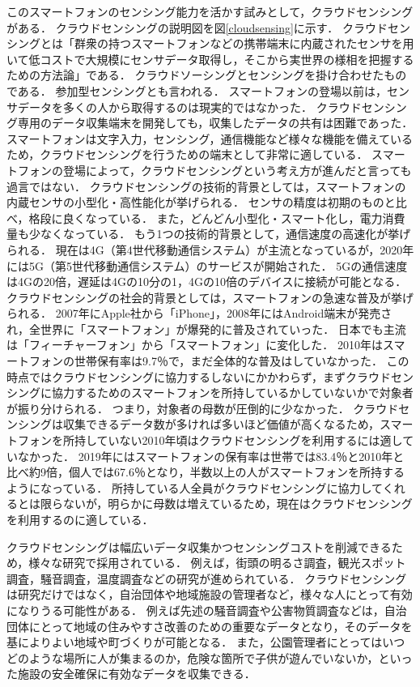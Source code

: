 このスマートフォンのセンシング能力を活かす試みとして，クラウドセンシングがある．
クラウドセンシングの説明図を図\ref{cloudsensing}に示す．
クラウドセンシングとは「群衆の持つスマートフォンなどの携帯端末に内蔵されたセンサを用いて低コストで大規模にセンサデータ取得し，そこから実世界の様相を把握するための方法論\cite{weko}」である．
クラウドソーシングとセンシングを掛け合わせたものである．
参加型センシングとも言われる．
スマートフォンの登場以前は，センサデータを多くの人から取得するのは現実的ではなかった．
クラウドセンシング専用のデータ収集端末を開発しても，収集したデータの共有は困難であった．
スマートフォンは文字入力，センシング，通信機能など様々な機能を備えているため，クラウドセンシングを行うための端末として非常に適している．
スマートフォンの登場によって，クラウドセンシングという考え方が進んだと言っても過言ではない．
クラウドセンシングの技術的背景としては，スマートフォンの内蔵センサの小型化・高性能化が挙げられる．
センサの精度は初期のものと比べ，格段に良くなっている．
また，どんどん小型化・スマート化し，電力消費量も少なくなっている．
もう1つの技術的背景として，通信速度の高速化が挙げられる．
現在は4G（第4世代移動通信システム）が主流となっているが，2020年には5G（第5世代移動通信システム）のサービスが開始された．
5Gの通信速度は4Gの20倍，遅延は4Gの10分の1，4Gの10倍のデバイスに接続が可能となる\cite{5G4G}．
クラウドセンシングの社会的背景としては，スマートフォンの急速な普及が挙げられる．
2007年にApple社から「iPhone」，2008年にはAndroid端末が発売され，全世界に「スマートフォン」が爆発的に普及されていった．
日本でも主流は「フィーチャーフォン」から「スマートフォン」に変化した．
2010年はスマートフォンの世帯保有率は9.7％\cite{soumu}で，まだ全体的な普及はしていなかった．
この時点ではクラウドセンシングに協力するしないにかかわらず，まずクラウドセンシングに協力するためのスマートフォンを所持しているかしていないかで対象者が振り分けられる．
つまり，対象者の母数が圧倒的に少なかった．
クラウドセンシングは収集できるデータ数が多ければ多いほど価値が高くなるため，スマートフォンを所持していない2010年頃はクラウドセンシングを利用するには適していなかった．
2019年にはスマートフォンの保有率は世帯では83.4％と2010年と比べ約9倍，個人では67.6％\cite{soumu}となり，半数以上の人がスマートフォンを所持するようになっている．
所持している人全員がクラウドセンシングに協力してくれるとは限らないが，明らかに母数は増えているため，現在はクラウドセンシングを利用するのに適している．

クラウドセンシングは幅広いデータ収集かつセンシングコストを削減できるため，様々な研究で採用されている．
例えば，街頭の明るさ調査，観光スポット調査，騒音調査，温度調査などの研究が進められている\cite{liu}．
クラウドセンシングは研究だけではなく，自治団体や地域施設の管理者など，様々な人にとって有効になりうる可能性がある．
例えば先述の騒音調査や公害物質調査などは，自治団体にとって地域の住みやすさ改善のための重要なデータとなり，そのデータを基によりよい地域や町づくりが可能となる．
また，公園管理者にとってはいつどのような場所に人が集まるのか，危険な箇所で子供が遊んでいないか，といった施設の安全確保に有効なデータを収集できる．

